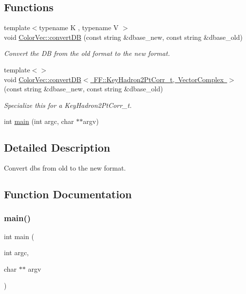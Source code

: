 \subsection*{Functions}
\begin{DoxyCompactItemize}
\item 
{\footnotesize template$<$typename K , typename V $>$ }\\void \mbox{\hyperlink{namespaceColorVec_a2de43a353cb0439d273dacf739397303}{Color\+Vec\+::convert\+DB}} (const string \&dbase\+\_\+new, const string \&dbase\+\_\+old)
\begin{DoxyCompactList}\small\item\em Convert the DB from the old format to the new format. \end{DoxyCompactList}\item 
{\footnotesize template$<$$>$ }\\void \mbox{\hyperlink{namespaceColorVec_a40c0262c4744b8e12e14737776edb8a9}{Color\+Vec\+::convert\+D\+B$<$ F\+F\+::\+Key\+Hadron2\+Pt\+Corr\+\_\+t, Vector\+Complex $>$}} (const string \&dbase\+\_\+new, const string \&dbase\+\_\+old)
\begin{DoxyCompactList}\small\item\em Specialize this for a Key\+Hadron2\+Pt\+Corr\+\_\+t. \end{DoxyCompactList}\item 
int \mbox{\hyperlink{adat-devel_2main_2dbutil_2dbconvert__read_8cc_a3c04138a5bfe5d72780bb7e82a18e627}{main}} (int argc, char $\ast$$\ast$argv)
\end{DoxyCompactItemize}


\subsection{Detailed Description}
Convert dbs from old to the new format. 



\subsection{Function Documentation}
\mbox{\label{adat-devel_2main_2dbutil_2dbconvert__read_8cc_a3c04138a5bfe5d72780bb7e82a18e627}} 
\subsubsection{\texorpdfstring{main()}{main()}}
{\footnotesize\ttfamily int main (\begin{DoxyParamCaption}\item[{int}]{argc,  }\item[{char $\ast$$\ast$}]{argv }\end{DoxyParamCaption})}

